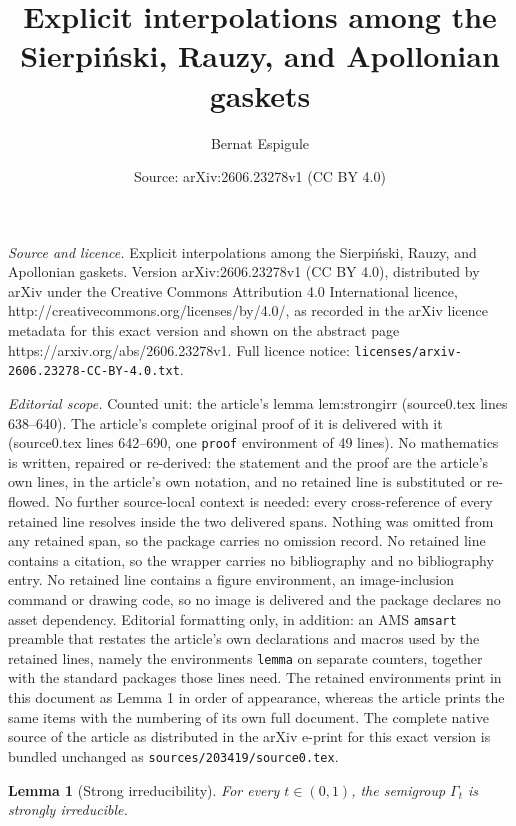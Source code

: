 \documentclass[10pt,a4paper]{amsart}
\title{Explicit interpolations among the Sierpi\'nski, Rauzy, and Apollonian gaskets}
\author{Bernat Espigule}
\date{Source: arXiv:2606.23278v1 (CC BY 4.0)}
\newtheorem{lemma}{Lemma}
\begin{document}
\maketitle

\noindent\emph{Source and licence.} Explicit interpolations among the Sierpi\'nski, Rauzy, and Apollonian gaskets. Version arXiv:2606.23278v1 (CC BY 4.0), distributed by arXiv under the Creative Commons Attribution 4.0 International licence, http://creativecommons.org/licenses/by/4.0/, as recorded in the arXiv licence metadata for this exact version and shown on the abstract page https://arxiv.org/abs/2606.23278v1. Full licence notice: \texttt{licenses/arxiv-2606.23278-CC-BY-4.0.txt}.\par\smallskip

\noindent\textit{Editorial scope.} Counted unit: the article's lemma lem:strongirr (source0.tex lines 638--640). The article's complete original proof of it is delivered with it (source0.tex lines 642--690, one \texttt{proof} environment of 49 lines). No mathematics is written, repaired or re-derived: the statement and the proof are the article's own lines, in the article's own notation, and no retained line is substituted or re-flowed.  No further source-local context is needed: every cross-reference of every retained line resolves inside the two delivered spans.  Nothing was omitted from any retained span, so the package carries no omission record.  No retained line contains a citation, so the wrapper carries no bibliography and no bibliography entry.  No retained line contains a figure environment, an image-inclusion command or drawing code, so no image is delivered and the package declares no asset dependency.  Editorial formatting only, in addition: an AMS \texttt{amsart} preamble that restates the article's own declarations and macros used by the retained lines, namely the environments \texttt{lemma} on separate counters, together with the standard packages those lines need.  The retained environments print in this document as Lemma 1 in order of appearance, whereas the article prints the same items with the numbering of its own full document.  The complete native source of the article as distributed in the arXiv e-print for this exact version is bundled unchanged as \texttt{sources/203419/source0.tex}.
\begin{lemma}[Strong irreducibility]\label{lem:strongirr}
For every $t\in(0,1)$, the semigroup $\Gamma_t$ is strongly irreducible.
\end{lemma}
\end{document}
